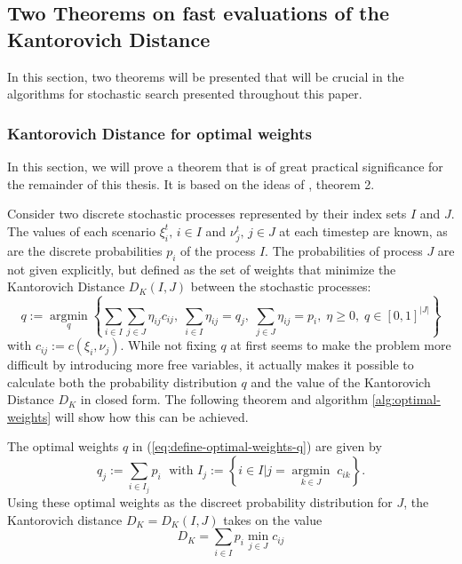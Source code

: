 \subsection{Two Theorems on fast evaluations of the Kantorovich Distance}
In this section, two theorems will be presented that will be crucial in the algorithms for stochastic search presented throughout this paper.
\subsubsection{Kantorovich Distance for optimal weights}
\label{sec:optimal-weights-proof}
In this section, we will prove a theorem that is of great practical significance for the remainder of this thesis. It is based on the ideas of \cite{Dupacova2003}, theorem 2. 

Consider two discrete stochastic processes represented by their index sets $I$ and $J$. The values of each scenario $\xi_i^t,\, i\in I$ and $\nu_j^t,\, j\in J$ at each timestep are known, as are the discrete probabilities $p_i$ of the process $I$. The probabilities of process $J$ are not given explicitly, but defined as the set of weights that minimize the Kantorovich Distance $D_K(I,J)$ between the stochastic processes:
\begin{equation}
  \label{eq:define-optimal-weights-q}
  q := \underset{q}{\operatorname{argmin}}\left\{\sum_{i\in I}\sum_{j\in J}\eta_{ij}c_{ij},\; \sum_{i\in I}\eta_{ij} = q_j,\; \sum_{j\in J}\eta_{ij} = p_i,\;\eta\geq 0,\; q\in \left[0,1\right]^{|J|} \right\}
\end{equation}
with $c_{ij} := c(\xi_i,\nu_j)$.
While not fixing $q$ at first seems to make the problem more difficult by introducing more free variables, it actually makes it possible to calculate both the probability distribution $q$ and the value of the Kantorovich Distance $D_K$ in closed form.
The following theorem and algorithm \ref{alg:optimal-weights} will show how this can be achieved.
\begin{thm}
  \label{thm:optimal-weights}
  The optimal weights $q$ in (\ref{eq:define-optimal-weights-q}) are given by
  \begin{equation}
    \label{eq:optimal-weights-in-thm}
    q_j := \sum_{i\in I_j} p_i\;\text{ with } I_j:=\left\{i\in I| j = \underset{k\in J}{\operatorname{argmin}}\; c_{ik}\right\}.
  \end{equation}
  Using these optimal weights as the discreet probability distribution for $J$, the Kantorovich distance $D_K=D_K(I,J)$ takes on the value
  \begin{equation}
    \label{eq:define-Dk-optimalweights-thm}
    D_K = \sum_{i\in I}p_i\min\limits_{j\in J}c_{ij}
  \end{equation}
\end{thm}
